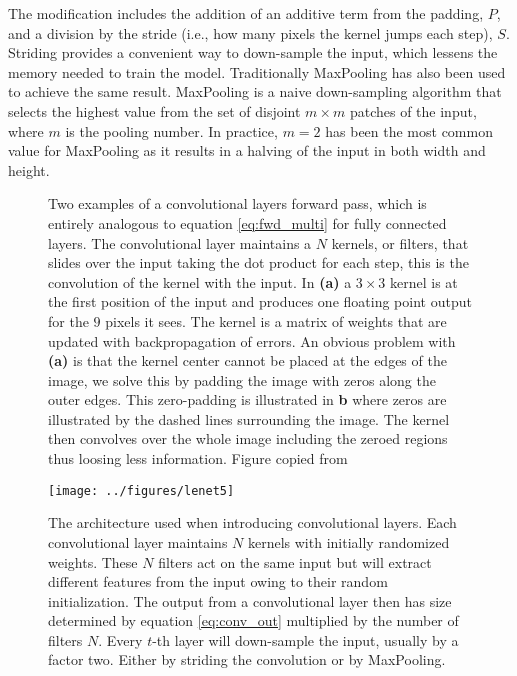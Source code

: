 \noindent The modification includes the addition of an additive term from the padding, $P$, and a division by the stride (i.e., how many pixels the kernel jumps each step), $S$. Striding provides a convenient way to down-sample the input, which lessens the memory needed to train the model. Traditionally MaxPooling has also been used to achieve the same result. MaxPooling is a naive down-sampling algorithm that selects the highest value from the set of disjoint $m\times m$ patches of the input, where $m$ is the pooling number. In practice, $m=2$ has been the most common value for MaxPooling as it results in a halving of the input in both width and height.

\begin{figure}
\centering
{}
\caption[Convolutional layer illustration]{Two examples of a convolutional layers forward pass, which is entirely analogous to equation \ref{eq:fwd_multi} for fully connected layers. The convolutional layer maintains a $N$ kernels, or filters, that slides over the input taking the dot product for each step, this is the convolution of the kernel with the input. In \textbf{(a)} a $3\times3$ kernel is at the first position of the input and produces one floating point output for the $9$ pixels it sees. The kernel is a matrix of weights that are updated with backpropagation of errors. An obvious problem with \textbf{(a)} is that the kernel center cannot be placed at the edges of the image, we solve this by padding the image with zeros along the outer edges. This zero-padding is illustrated in \textbf{b} where zeros are illustrated by the dashed lines surrounding the image. The kernel then convolves over the whole image including the zeroed regions thus loosing less information. Figure copied from \citet{Dumoulin2016}}\label{fig:conv_aritmetic} 
\end{figure}

\begin{figure}
\centering
\texttt{[image: ../figures/lenet5]}
\caption[Original LeNet architecture]{The architecture \citet{Lecun1998} used when introducing convolutional layers. Each convolutional layer maintains $N$ kernels with initially randomized weights. These $N$ filters act on the same input but will extract different features from the input owing to their random initialization. The output from a convolutional layer then has size determined by equation \ref{eq:conv_out} multiplied by the number of filters $N$. Every $t$-th layer will down-sample the input, usually by a factor two. Either by striding the convolution or by MaxPooling.}\label{fig:lenet5}
\end{figure}

